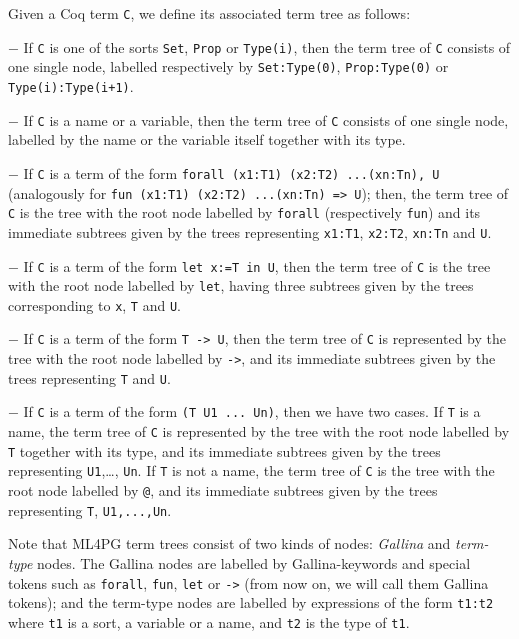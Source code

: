 \begin{definition}\label{def:ml4pgtermtree}
Given a Coq term \lstinline?C?, we define its associated term tree as follows:

$-$ If \lstinline?C? is one of the sorts \lstinline?Set?, \lstinline?Prop? or \lstinline?Type(i)?, then the term tree of
 \lstinline?C? consists of one single node, labelled respectively by \lstinline?Set:Type(0)?, \lstinline?Prop:Type(0)? or \lstinline?Type(i):Type(i+1)?.

$-$ If \lstinline?C? is a name or a variable, then
 the term tree of \lstinline?C? consists of one single node, labelled by the name or the variable itself together with its type.

$-$ If \lstinline?C? is a term of the form \lstinline?forall (x1:T1) (x2:T2) ...(xn:Tn), U? (analogously for \lstinline?fun (x1:T1) (x2:T2) ...(xn:Tn) => U?);
then, the term tree of \lstinline?C? is the tree with the root node labelled by \lstinline?forall? (respectively \lstinline?fun?)
and its immediate subtrees given by the trees representing \lstinline?x1:T1?, \lstinline?x2:T2?, \lstinline?xn:Tn? and \lstinline?U?.

$-$ If \lstinline?C? is a term of the form \lstinline?let x:=T in U?, then the term tree of \lstinline?C?
 is the tree with the root node labelled by \lstinline?let?, having three subtrees given by the trees corresponding to \lstinline?x?, \lstinline?T? and \lstinline?U?.


$-$ If \lstinline?C? is a term of the form  \lstinline?T -> U?, then  the term tree of \lstinline?C?  is represented by the tree with the root node labelled by
\lstinline?->?, and its immediate subtrees given by the trees representing  \lstinline?T? and \lstinline?U?.

$-$ If \lstinline?C? is a term of the form  \lstinline?(T U1 ... Un)?, then we have two cases.
If \lstinline?T? is a name, the term tree of \lstinline?C?  is represented by
the tree with the root node labelled by \lstinline?T? together with its type, and its immediate subtrees given by the trees
representing \lstinline?U1?,\ldots, \lstinline?Un?. If \lstinline?T? is not a  name, the term tree of \lstinline?C?
is the tree with the root node labelled by \lstinline?@?, and its immediate subtrees given by the trees
representing \lstinline?T?, \lstinline?U1,...,Un?.


\end{definition}


Note that ML4PG term trees consist of two kinds of nodes: \emph{Gallina} and \emph{term-type} nodes. The Gallina nodes are
labelled by Gallina-keywords and special tokens such as \lstinline?forall?, \lstinline?fun?, \lstinline?let? or \lstinline?->? (from now on, we will call them Gallina tokens);
and the term-type nodes are labelled by expressions of the form \lstinline?t1:t2? where \lstinline?t1? is a sort, a variable or
a name, and  \lstinline?t2? is the type of \lstinline?t1?.


